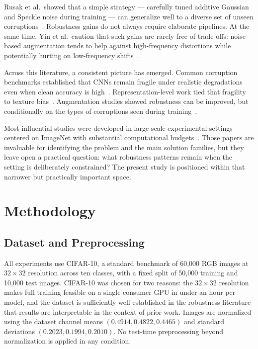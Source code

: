 \documentclass[conference]{IEEEtran}
\begin{document}
Rusak et al.\ showed that a simple strategy --- carefully tuned additive Gaussian and Speckle noise during training --- can generalize well to a diverse set of unseen corruptions~\cite{rusak2020}. Robustness gains do not always require elaborate pipelines. At the same time, Yin et al.\ caution that such gains are rarely free of trade-offs: noise-based augmentation tends to help against high-frequency distortions while potentially hurting on low-frequency shifts~\cite{yin2019,rusak2020}.

Across this literature, a consistent picture has emerged. Common corruption benchmarks established that CNNs remain fragile under realistic degradations even when clean accuracy is high~\cite{hendrycks2019}. Representation-level work tied that fragility to texture bias~\cite{geirhos2019}. Augmentation studies showed robustness can be improved, but conditionally on the types of corruptions seen during training~\cite{hendrycks2020,mintun2021,rusak2020,yin2019}.

Most influential studies were developed in large-scale experimental settings centered on ImageNet with substantial computational budgets~\cite{hendrycks2019,hendrycks2020,mintun2021,geirhos2019,rusak2020}. Those papers are invaluable for identifying the problem and the main solution families, but they leave open a practical question: what robustness patterns remain when the setting is deliberately constrained? The present study is positioned within that narrower but practically important space.

\section{Methodology}

\subsection{Dataset and Preprocessing}

All experiments use CIFAR-10, a standard benchmark of 60,000 RGB images at $32{\times}32$ resolution across ten classes, with a fixed split of 50,000 training and 10,000 test images. CIFAR-10 was chosen for two reasons: the $32{\times}32$ resolution makes full training feasible on a single consumer GPU in under an hour per model, and the dataset is sufficiently well-established in the robustness literature that results are interpretable in the context of prior work. Images are normalized using the dataset channel means $(0.4914, 0.4822, 0.4465)$ and standard deviations $(0.2023, 0.1994, 0.2010)$. No test-time preprocessing beyond normalization is applied in any condition.
\end{document}
